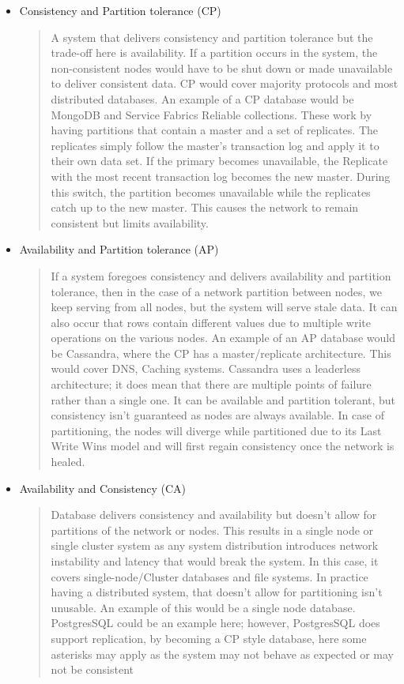 \documentclass[a4paper,10pt,titlepage]{report}
\begin{document}
\begin{itemize}
    \item Consistency and Partition tolerance (CP) \\ 
    \begin{quote}
         A system that delivers consistency and partition tolerance but the trade-off here is availability. If a partition occurs in the system, the non-consistent nodes would have to be shut down or made unavailable to deliver consistent data. CP would cover majority protocols and most distributed databases. An example of a CP database would be MongoDB and Service Fabrics Reliable collections. These work by having partitions that contain a master and a set of replicates. The replicates simply follow the master's transaction log and apply it to their own data set. If the primary becomes unavailable, the Replicate with the most recent transaction log becomes the new master. During this switch, the partition becomes unavailable while the replicates catch up to the new master. This causes the network to remain consistent but limits availability.
    \end{quote}


    \item Availability and Partition tolerance (AP) \\ 
    \begin{quote}
    If a system foregoes consistency and delivers availability and partition tolerance, then in the case of a network partition between nodes, we keep serving from all nodes, but the system will serve stale data. It can also occur that rows contain different values due to multiple write operations on the various nodes. An example of an AP database would be Cassandra, where the CP has a master/replicate architecture. This would cover DNS, Caching systems. Cassandra uses a leaderless architecture; it does mean that there are multiple points of failure rather than a single one. It can be available and partition tolerant, but consistency isn't guaranteed as nodes are always available. In case of partitioning, the nodes will diverge while partitioned due to its Last Write Wins model and will first regain consistency once the network is healed. 
    \end{quote}

    \item Availability and Consistency (CA) \\ 
    \begin{quote}Database delivers consistency and availability but doesn't allow for partitions of the network or nodes. This results in a single node or single cluster system as any system distribution introduces network instability and latency that would break the system. In this case, it covers single-node/Cluster databases and file systems. In practice having a distributed system, that doesn't allow for partitioning isn't unusable. An example of this would be a single node database. PostgresSQL could be an example here; however, PostgresSQL does support replication, by becoming a CP style database, here some asterisks may apply as the system may not behave as expected or may not be consistent\cite{aphyrpostgres}  \end{quote}
\end{itemize}
\end{document}
